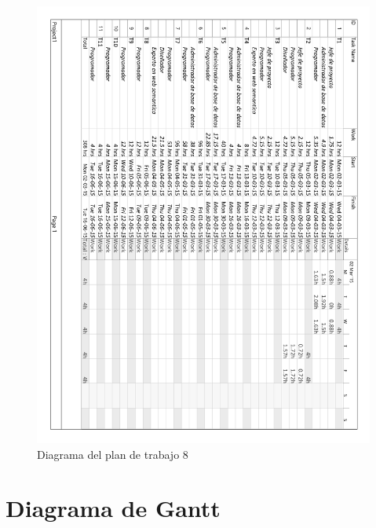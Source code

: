 \begin{figure}[!htp]
	\centering
	\includegraphics[page=8, scale=.8]{fig/real_work_plan_diagram}
	\caption{Diagrama del plan de trabajo 8}
\end{figure}

\FloatBarrier

\section{Diagrama de Gantt}

